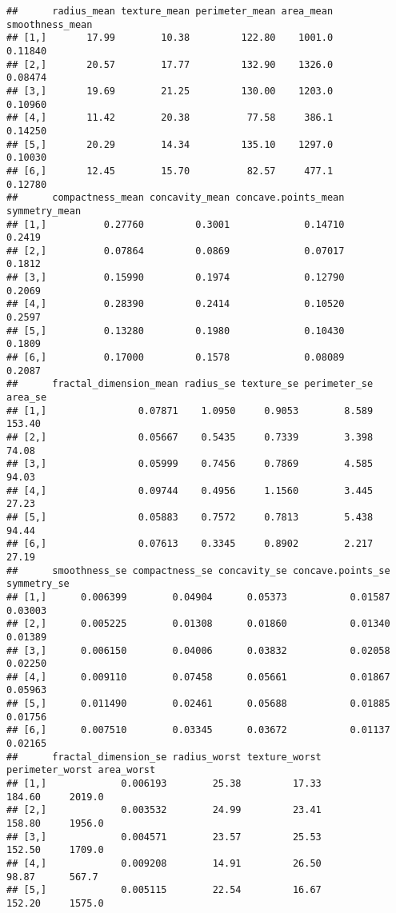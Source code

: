 \documentclass[
]{article}
\begin{document}
\begin{verbatim}
##      radius_mean texture_mean perimeter_mean area_mean smoothness_mean
## [1,]       17.99        10.38         122.80    1001.0         0.11840
## [2,]       20.57        17.77         132.90    1326.0         0.08474
## [3,]       19.69        21.25         130.00    1203.0         0.10960
## [4,]       11.42        20.38          77.58     386.1         0.14250
## [5,]       20.29        14.34         135.10    1297.0         0.10030
## [6,]       12.45        15.70          82.57     477.1         0.12780
##      compactness_mean concavity_mean concave.points_mean symmetry_mean
## [1,]          0.27760         0.3001             0.14710        0.2419
## [2,]          0.07864         0.0869             0.07017        0.1812
## [3,]          0.15990         0.1974             0.12790        0.2069
## [4,]          0.28390         0.2414             0.10520        0.2597
## [5,]          0.13280         0.1980             0.10430        0.1809
## [6,]          0.17000         0.1578             0.08089        0.2087
##      fractal_dimension_mean radius_se texture_se perimeter_se area_se
## [1,]                0.07871    1.0950     0.9053        8.589  153.40
## [2,]                0.05667    0.5435     0.7339        3.398   74.08
## [3,]                0.05999    0.7456     0.7869        4.585   94.03
## [4,]                0.09744    0.4956     1.1560        3.445   27.23
## [5,]                0.05883    0.7572     0.7813        5.438   94.44
## [6,]                0.07613    0.3345     0.8902        2.217   27.19
##      smoothness_se compactness_se concavity_se concave.points_se symmetry_se
## [1,]      0.006399        0.04904      0.05373           0.01587     0.03003
## [2,]      0.005225        0.01308      0.01860           0.01340     0.01389
## [3,]      0.006150        0.04006      0.03832           0.02058     0.02250
## [4,]      0.009110        0.07458      0.05661           0.01867     0.05963
## [5,]      0.011490        0.02461      0.05688           0.01885     0.01756
## [6,]      0.007510        0.03345      0.03672           0.01137     0.02165
##      fractal_dimension_se radius_worst texture_worst perimeter_worst area_worst
## [1,]             0.006193        25.38         17.33          184.60     2019.0
## [2,]             0.003532        24.99         23.41          158.80     1956.0
## [3,]             0.004571        23.57         25.53          152.50     1709.0
## [4,]             0.009208        14.91         26.50           98.87      567.7
## [5,]             0.005115        22.54         16.67          152.20     1575.0

\end{verbatim}
\end{document}
